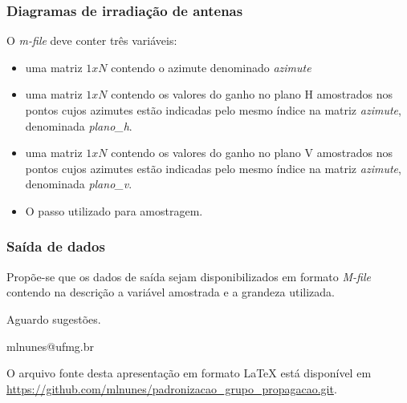 \documentclass[11pt]{beamer}
\begin{document}
\begin{frame}
	\frametitle{Diagramas de irradiação de antenas}
	O \textit{m-file} deve conter três variáveis: 
	\begin{itemize}
		\item uma matriz $1xN$ contendo o azimute denominado \textit{azimute}
		\item uma matriz $1xN$ contendo os valores do ganho no plano H amostrados nos pontos cujos azimutes estão indicadas pelo mesmo índice na matriz \emph{azimute}, denominada \textit{plano\_h}.
		\item uma matriz $1xN$ contendo os valores do ganho no plano V amostrados nos pontos cujos azimutes estão indicadas pelo mesmo índice na matriz \emph{azimute}, denominada \textit{plano\_v}.
		\item O passo utilizado para amostragem.
	\end{itemize}
	
\end{frame}

\begin{frame}
	\frametitle{Saída de dados}
		Propõe-se que os dados de saída sejam disponibilizados em formato \emph{M-file} contendo na descrição a variável amostrada e a grandeza utilizada. 
\end{frame}

\begin{frame}
	\centering
	{\Huge Aguardo sugestões.}
	\parbox{\linewidth}{\vspace*{30pt}\centering mlnunes@ufmg.br}
	
	\footnotesize\parbox{\linewidth}{\vspace*{90pt}O arquivo fonte desta apresentação em formato {\LaTeX} está disponível em \url{https://github.com/mlnunes/padronizacao_grupo_propagacao.git}.}
\end{frame}
\end{document}
